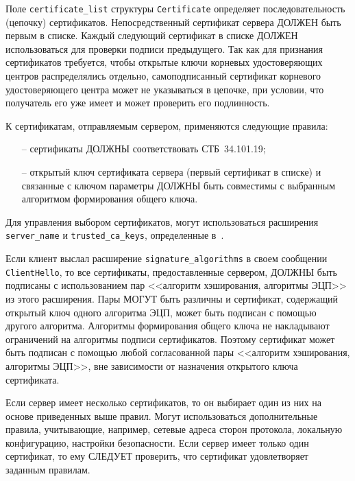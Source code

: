 Поле \lstinline{certificate_list} структуры \lstinline{Certificate}
определяет последовательность (цепочку) сертификатов. Непосредственный
сертификат сервера ДОЛЖЕН быть первым в списке. Каждый следующий сертификат
в списке ДОЛЖЕН использоваться для проверки подписи предыдущего. Так как
для признания сертификатов требуется, чтобы открытые ключи корневых
удостоверяющих центров распределялись отдельно, самоподписанный сертификат
корневого удостоверяющего центра может не указываться в цепочке, при
условии, что получатель его уже имеет и может проверить его подлинность.

К сертификатам, отправляемым сервером, применяются следующие правила:
\begin{itemize}
\item[--]
сертификаты ДОЛЖНЫ соответствовать СТБ~34.101.19;

\item[--]
открытый ключ сертификата сервера (первый сертификат в списке) и 
связанные с ключом параметры ДОЛЖНЫ быть совместимы с выбранным 
алгоритмом формирования общего ключа. 
\end{itemize}

\begin{note*}
Для управления выбором сертификатов, могут использоваться 
расширения \lstinline{server_name} и \lstinline{trusted_ca_keys}, 
определенные в~\cite{RFC6066}.
\end{note*} 

Если клиент выслал расширение \lstinline{signature_algorithms} в своем сообщении 
\lstinline{ClientHello}, то все сертификаты, предоставленные сервером, ДОЛЖНЫ быть 
подписаны с использованием пар <<алгоритм хэширования, алгоритмы ЭЦП>> из 
этого расширения. Пары МОГУТ быть различны и сертификат, содержащий 
открытый ключ одного алгоритма ЭЦП, может быть подписан с помощью другого 
алгоритма. Алгоритмы формирования общего ключа не накладывают ограничений 
на алгоритмы подписи сертификатов. Поэтому сертификат может быть подписан 
с помощью любой согласованной пары <<алгоритм хэширования, алгоритмы ЭЦП>>, 
вне зависимости от назначения открытого ключа сертификата. 

Если сервер имеет несколько сертификатов, то он выбирает один из них на 
основе приведенных выше правил. Могут использоваться дополнительные 
правила, учитывающие, например, сетевые адреса сторон протокола, локальную 
конфигурацию, настройки безопасности. Если сервер имеет только один 
сертификат, то ему СЛЕДУЕТ проверить, что сертификат удовлетворяет 
заданным правилам. 

